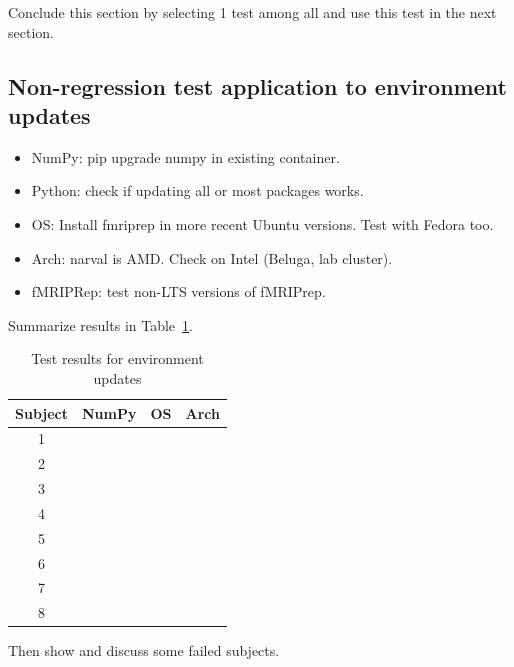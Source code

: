 \documentclass{article}
\begin{document}
Conclude this section by selecting 1 test among all and use this test in the
next section.

\subsection{Non-regression test application to environment updates}

\begin{itemize}
    \item NumPy: pip upgrade numpy in existing container.
    \item Python: check if updating all or most packages works.
    \item OS: Install fmriprep in more recent Ubuntu versions. Test with Fedora
          too.
    \item Arch: narval is AMD. Check on Intel (Beluga, lab cluster).
    \item fMRIPRep: test non-LTS versions of fMRIPrep.
\end{itemize}

Summarize results in Table~\ref{table:environment-updates}.
\begin{table}
    \begin{center}
        \begin{tabular}{cccc}
            Subject & NumPy                & OS                 & Arch                 \\
            \hline
            1       & \cellcolor{green!25} & \cellcolor{red!25} & \cellcolor{green!25} \\
            2       & \cellcolor{green!25} & \cellcolor{red!25} & \cellcolor{green!25} \\
            3       & \cellcolor{green!25} & \cellcolor{red!25} & \cellcolor{green!25} \\
            4       & \cellcolor{green!25} & \cellcolor{red!25} & \cellcolor{green!25} \\
            5       & \cellcolor{green!25} & \cellcolor{red!25} & \cellcolor{green!25} \\
            6       & \cellcolor{green!25} & \cellcolor{red!25} & \cellcolor{green!25} \\
            7       & \cellcolor{green!25} & \cellcolor{red!25} & \cellcolor{green!25} \\
            8       & \cellcolor{green!25} & \cellcolor{red!25} & \cellcolor{green!25} \\
        \end{tabular}
        \caption{Test results for environment updates}
        \label{table:environment-updates}
    \end{center}
\end{table}
Then show and discuss some failed subjects.
\end{document}
